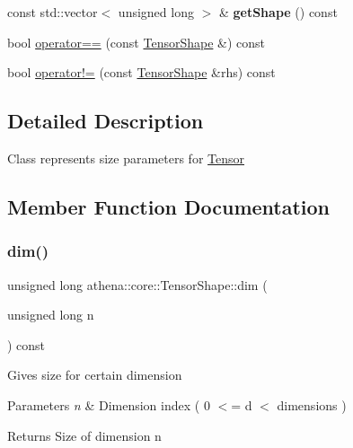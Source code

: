 \begin{DoxyCompactItemize}
\item 
\mbox{\label{classathena_1_1core_1_1_tensor_shape_ab76bd8f258b315eedcae3eae2d46a73d}} 
const std\+::vector$<$ unsigned long $>$ \& {\bfseries get\+Shape} () const
\item 
bool \mbox{\hyperlink{classathena_1_1core_1_1_tensor_shape_aa42737e3e51e76507bb60791889d4d9b}{operator==}} (const \mbox{\hyperlink{classathena_1_1core_1_1_tensor_shape}{Tensor\+Shape}} \&) const
\item 
bool \mbox{\hyperlink{classathena_1_1core_1_1_tensor_shape_acdb5b20f9922cb4d7ee29a868fd05b1b}{operator!=}} (const \mbox{\hyperlink{classathena_1_1core_1_1_tensor_shape}{Tensor\+Shape}} \&rhs) const
\end{DoxyCompactItemize}


\subsection{Detailed Description}
Class represents size parameters for \mbox{\hyperlink{classathena_1_1core_1_1_tensor}{Tensor}} 

\subsection{Member Function Documentation}
\mbox{\label{classathena_1_1core_1_1_tensor_shape_ac0433f4e7a42e5307bb9fb976befdd47}} 
\subsubsection{\texorpdfstring{dim()}{dim()}}
{\footnotesize\ttfamily unsigned long athena\+::core\+::\+Tensor\+Shape\+::dim (\begin{DoxyParamCaption}\item[{unsigned long}]{n }\end{DoxyParamCaption}) const}

Gives size for certain dimension 
\begin{DoxyParams}{Parameters}
{\em n} & Dimension index ( 0 $<$= d $<$ dimensions ) \\
\hline
\end{DoxyParams}
\begin{DoxyReturn}{Returns}
Size of dimension n 
\end{DoxyReturn}
\mbox{\label{classathena_1_1core_1_1_tensor_shape_a73f686650f41bd7fa065aa16dfc4529f}} 
